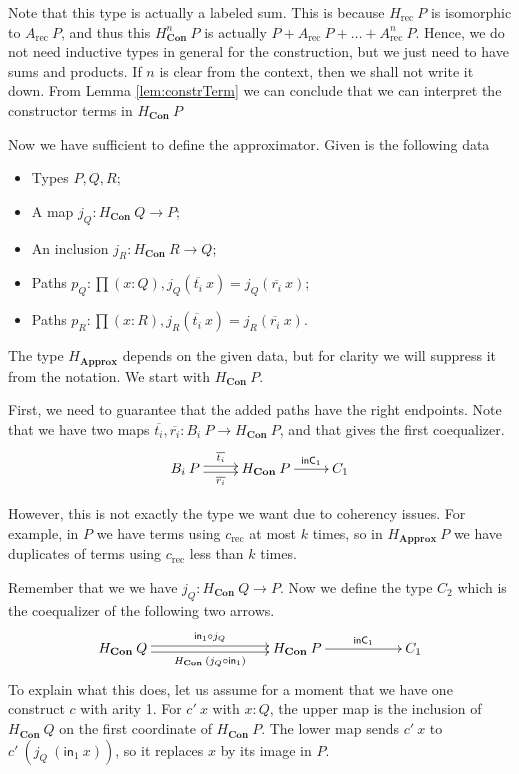\documentclass[a4paper,UKenglish]{lipics-v2016}
\newcommand{\Boperator}[1]{\mathsf{#1}}
\newcommand{\inn}{\Boperator{in}}
\newcommand{\rec}[0]{\operatorname{rec}}
\newcommand{\Con}[0]{\textbf{Con}}
\newcommand{\Approx}[0]{\textbf{Approx}}
\newcommand{\inC}[0]{\Boperator{inC}}
\begin{document}
Note that this type is actually a labeled sum.
This is because $H_{\rec} \> P$ is isomorphic to $A_{\rec} \> P$, and thus this $H_{\Con}^n \> P$ is actually $P + A_{\rec} \> P + \ldots + A_{\rec}^n \> P$.
Hence, we do not need inductive types in general for the construction, but we just need to have sums and products.
If $n$ is clear from the context, then we shall not write it down.
From Lemma \ref{lem:constrTerm} we can conclude that we can interpret the constructor terms in $H_{\Con} \> P$

Now we have sufficient to define the approximator.
Given is the following data
\begin{itemize}
        \item Types $P, Q, R$;
        \item A map $j_Q : H_{\Con} \> Q \rightarrow P$;
        \item An inclusion $j_R : H_{\Con} \> R \rightarrow Q$;
        \item Paths $p_Q : \prod (x : Q), j_Q(\overline{t_i} \> x) = j_Q(\overline{r_i} \> x)$;
        \item Paths $p_R : \prod (x : R), j_R(\overline{t_i} \> x) = j_R(\overline{r_i} \> x)$.
\end{itemize}
The type $H_{\Approx}$ depends on the given data, but for clarity we will suppress it from the notation.
We start with $H_{\Con} \> P$.

First, we need to guarantee that the added paths have the right endpoints.
Note that we have two maps $\overline{t_i}, \overline{r_i} : B_i \> P \rightarrow H_{\Con} \> P$, and that gives the first coequalizer.
\[
\xymatrix
{
        B_i \> P \ar@<-.5ex>[r]_-{\overline{r_i}} \ar@<.5ex>[r]^-{\overline{t_i}} & H_{\Con} \> P \ar[r]^-{\inC_1} & C_1
}
\]

However, this is not exactly the type we want due to coherency issues.
For example, in $P$ we have terms using $c_{\rec}$ at most $k$ times, so in $H_{\Approx} \> P$ we have duplicates of terms using $c_{\rec}$ less than $k$ times.

Remember that we we have $j_Q : H_{\Con} \> Q \rightarrow P$.
Now we define the type $C_2$ which is the coequalizer of the following two arrows.
\[
\xymatrix
{
        H_{\Con} \> Q \ar@<-.5ex>[rrr]_-{H_{\Con} \> (j_Q \circ \inn_1)} \ar@<.5ex>[rrr]^-{\inn_1 \circ j_Q} & & & H_{\Con} \> P \ar[rr]^-{\inC_1} & & C_1
}
\]
To explain what this does, let us assume for a moment that we have one construct $c$ with arity 1.
For $c' \> x$ with $x : Q$, the upper map is the inclusion of $H_{\Con} \> Q$ on the first coordinate of $H_{\Con} \> P$.
The lower map sends $c' \> x$ to $c' \> (j_Q \> (\inn_1 \> x))$, so it replaces $x$ by its image in $P$.
\end{document}
